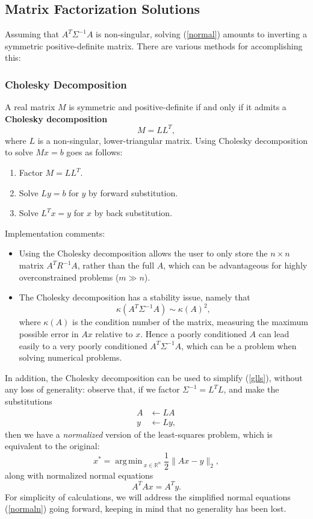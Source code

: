 \documentclass[reqno]{amsart}
\DeclareMathOperator*{\argmin}{arg\,min\,}
\numberwithin{equation}{section}
\begin{document}
\subsection{Matrix Factorization Solutions}
Assuming that $A^T \Sigma^{-1} A$ is non-singular, solving (\ref{normal}) amounts to inverting a
symmetric positive-definite matrix. There are various methods for accomplishing this:
\subsubsection{Cholesky Decomposition}
A real matrix $M$ is symmetric and positive-definite if and only if it admits
a \textbf{Cholesky decomposition}
$$
M = LL^T,
$$
where $L$ is a non-singular, lower-triangular matrix. Using Cholesky decomposition to solve
$Mx = b$ goes as follows:
\begin{enumerate}
    \item Factor $M = LL^T$.
    \item Solve $Ly = b$ for $y$ by forward substitution.
    \item Solve $L^Tx = y$ for $x$ by back substitution.
\end{enumerate}

Implementation comments:
\begin{itemize}
\item Using the Cholesky decomposition allows the user to only store the $n\times n$ matrix
    $A^T R^{-1} A$, rather than the full $A$, which can be advantageous for highly overconstrained
    problems ($m \gg n$).
\item The Cholesky decomposition has a stability issue, namely that
    $$
    \kappa(A^T \Sigma^{-1} A) \sim \kappa(A)^2,
    $$
    where $\kappa(A)$ is the condition
    number of the matrix, measuring the maximum possible error in $Ax$ relative to $x$. Hence
    a poorly conditioned $A$ can lead easily to a very poorly conditioned $A^T \Sigma^{-1} A$, which
    can be a problem when solving numerical problems.
\end{itemize}

In addition, the Cholesky decomposition can be used to simplify (\ref{glls}), without any
loss of generality: observe that, if we factor $\Sigma^{-1} = L^TL$, and make the
substitutions
\begin{align*}
    A &\leftarrow LA \\
    y &\leftarrow Ly,
\end{align*}
then we have a \emph{normalized} version of the least-squares problem, which is equivalent
to the original:
\begin{equation}
    x^* = \argmin_{x \in \mathbb R^n} \frac12 \| Ax - y\|_2,
\label{gllsn}
\end{equation}
along with normalized normal equations
\begin{equation}
    A^TAx = A^Ty.
\label{normaln}
\end{equation}
For simplicity of calculations, we will address the simplified normal equations
(\ref{normaln}) going forward, keeping in mind that no generality has been lost.
\end{document}

